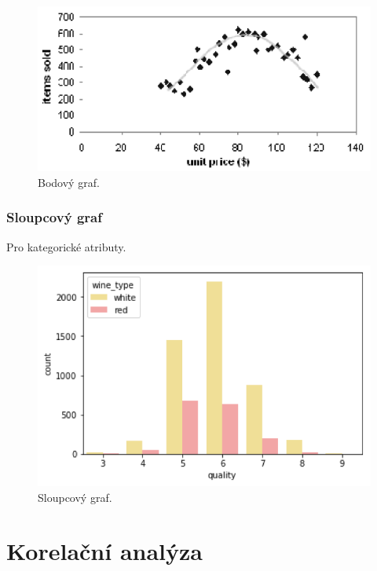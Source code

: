 \begin{figure}[H]
    \centering
    \includegraphics[width=0.75\linewidth]{bodovy_graf.png}
    \caption{Bodový graf.}
\end{figure}

\subsubsection{Sloupcový graf}

\begin{compactitem}
    \item Pro kategorické atributy.
\end{compactitem}

\begin{figure}[H]
    \centering
    \includegraphics[width=0.75\linewidth]{sloupcovy_graf.png}
    \caption{Sloupcový graf.}
\end{figure}


\section{Korelační analýza}

